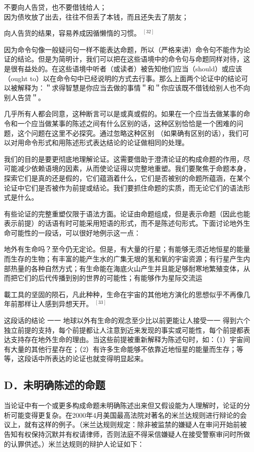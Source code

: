 \begin{displayquote}
不要向人告贷，也不要借钱给人；\\
因为债坆放了出去，往往不但丢了本钱，而且还失去了朋友；
\end{displayquote}

向人告货的结果，容易养成因循懒惰的习惯。 ${ }^{[32]}$

因为命令句像一般疑问句一样不能表达命题，所以（严格来讲）命令句不能作为论证的结论。但是为简明计，我们可以把在这些语境中的命令句与命题同样对待，这是很有益处的。在这些语境中听者（或读者）被告知他们应当（should）或应该（ought to）以在命令句中已经说明的方式去行事。那么上面两个论证中的结论可以被解释为：＂求得智慧是你应当去做的事情＂和＂你应该既不借钱给别人也不向别人告贷＂。

几乎所有人都会同意，这种断言可以是或真或假的。如果在一个应当去做某事的命令和一个应当做某事的陈述之间有什么区别的话，这种区别恰恰是一个困难的问题，这个问题在这里不必探究。通过忽略这种区别 （如果确有区别的话），我们可以对用命令形式和用陈述形式表达结论的论证做相同的处理。

我们的目的是要更彻底地理解论证。这需要借助于澄清论证的构成命题的作用，尽可能减少依赖语境的因素，从而使论证得以完整地重塑。我们要聚焦于命题本身，探索它们是真的还是假的，它们蕴涵着什么，它们是否被别的命题所蕴涵，在某个论证中它们是否被作为前提或结论。我们要抓住命题的实质，而无论它们的语法形式是什么。

有些论证的完整重塑仅限于语法方面。论证由命题组成，但是表示命题（因此也能表示前提）的话语有时可能采用短语的形式，而不是陈述句形式。下面讨论地外生命可能性的一段话，可以很好地例示这一点：

地外有生命吗？至今仍无定论。但是，有大量的行星；有能够无须近地恒星的能量而生存的生物；有丰富的能产生水的广集无垠的氢和氧的宇宙资源；有行星产生内部热量的各种自然方式；有生命能在海底火山产生并且能足够耐寒地繁殖变体，从而把它们的后代传播到别的世界的可能性；有能够作为星际交流运

載工具的坚固的陨石，凡此种种，生命在宇宙的其他地方演化的思想似乎不再像几年前那样让人感到异想天开。 ${ }^{[33]}$

这段话的结论 一一 地球以外有生命的观念至少比以前更能让人接受一一 得到六个独立前提的支持，每个前提都让人注意到近来发现的事实或可能性，每个前提都表达支持存在地外生命的理由。当这些前提被重新解释为陈述句时，如：（1）宇宙间有大量的其他行星存在；（2）有许多生命能够不依靠近地恒星的能量而生存；等等，这段话中所表达的论证也就变得明显起来。

\subsection{D．未明确陈述的命题}
当论证中有一个或更多构成命题未明确陈述出来但又假设能为人理解时，论证的分析可能变得更复杂。在2000年4月美国最高法院对著名的米兰达规则进行辩论的会议上，就有这样的例子。（米兰达规则规定：除非被监禁的嫌疑人在审问开始前被告知有权保持沉默并有权请律师，否则法庭不得采信嫌疑人在接受警察审问时所做的认罪供述。）米兰达规则的辩护人论证如下：

